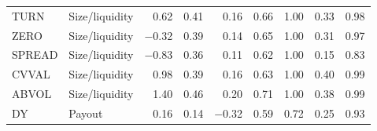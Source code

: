 \begin{tabular}{ll r rrr r rr}
TURN & Size/liquidity & 0.62 & 0.41 & 0.16 & 0.66 & 1.00 & 0.33 & 0.98 \\
ZERO & Size/liquidity & $-$0.32 & 0.39 & 0.14 & 0.65 & 1.00 & 0.31 & 0.97 \\
SPREAD & Size/liquidity & $-$0.83 & 0.36 & 0.11 & 0.62 & 1.00 & 0.15 & 0.83 \\
CVVAL & Size/liquidity & 0.98 & 0.39 & 0.16 & 0.63 & 1.00 & 0.40 & 0.99 \\
ABVOL & Size/liquidity & 1.40 & 0.46 & 0.20 & 0.71 & 1.00 & 0.38 & 0.99 \\
\addlinespace[2pt]
DY & Payout & 0.16 & 0.14 & $-$0.32 & 0.59 & 0.72 & 0.25 & 0.93 \\
\bottomrule
\end{tabular}